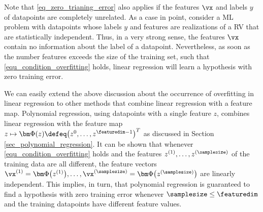 \documentclass[12pt]{report}
\newcommand{\featurelen}{\featuredim}
\begin{document}
Note that \eqref{eq_zero_trianing_error} also applies if the features $\vx$ and labels $y$ 
of datapoints are completely unrelated. As a case in point, consider a ML problem with  
datapoints whose labels $y$ and features are realizations of a RV that are statistically 
independent. Thus, in a very strong sense, the features $\vx$ contain no information 
about the label of a datapoint. Nevertheless, as soon as the number features exceeds 
the size of the training set, such that \eqref{equ_condition_overfitting} holds, linear regression 
will learn a hypothesis with zero training error. 

We can easily extend the above discussion about the occurrence of overfitting in linear 
regression to other methods that combine linear regression with a feature map. 
Polynomial regression, using datapoints with a single feature $z$, combines linear 
regression with the feature map $z \mapsto {\bm \Phi}(z) \defeq \big(z^{0},\ldots,z^{\featurelen-1}\big)^{T}$ 
as discussed in Section \ref{sec_polynomial_regression}. It can be shown that whenever \eqref{equ_condition_overfitting} 
holds and the features $z^{(1)},\ldots,z^{(\samplesize)}$ of the training data are all different, the 
feature vectors $\vx^{(1)}={\bm \Phi}\big(z^{(1)}\big),\ldots, \vx^{(\samplesize)}={\bm \Phi}\big(z^{(\samplesize)}\big)$ 
are linearly independent. This implies, in turn, that polynomial regression is guaranteed to find a hypothesis 
with zero training error whenever $\samplesize \leq \featurelen$ and the training datapoints have different 
feature values. 

\end{document}
